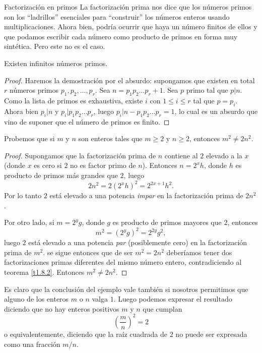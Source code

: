 \begin{section}{Factorización en primos}
La factorización prima nos dice que los números primos son los  ``ladrillos'' esenciales para  ``cons\-truir'' los números enteros usando multiplicaciones. Ahora bien, podría ocurrir que haya un número finitos de ellos y que podamos escribir cada número como producto de primos en forma muy sintética. Pero este no es el caso.

\begin{proposicion} Existen infinitos números primos. 
\end{proposicion} 
\begin{proof} Haremos la demostración por el absurdo: supongamos que existen en total $r$ números primos $p_1,p_2,\ldots, p_r$. Sea $n =  p_1p_2\ldots p_r+1$. Sea $p$ primo tal que $p|n$. Como la lista de primos es exhaustiva, existe $i$ con $1 \le i \le r$ tal que $p=p_i$. Ahora bien $p_i| n$ y $p_i|p_1p_2\ldots p_r$, luego $p_i|n-p_1p_2\ldots p_r =1$, lo cual es un absurdo que vino de suponer que el número de primos es finito.  
\end{proof}



\begin{ejemplo*} Probemos que si $m$ y $n$ son enteros tales que $m\ge 2$ y $n\ge 2$, entonces $m^2  \not=2n^2$.
\end{ejemplo*}
\begin{proof} Supongamos que la factorización prima de $n$ contiene al $2$ elevado a la $x$ (donde $x$ es cero si $2$ no es factor primo de $n$). Entonces $n=2^xh$, donde $h$ es producto de primos más grandes que $2$, luego 
$$
2n^2=2(2^xh)^2= 2^{2x+1}h^2.
$$
Por lo tanto $2$ está elevado a una potencia \textit{impar} en la factorización prima de $2n^2$.

Por otro lado, si $m=2^yg$, donde $g$ es producto de primos mayores que $2$, entonces
$$
m^2= (2^yg)^2 = 2^{2y}g^2,
$$
luego $2$ está elevado a una potencia \textit{par} (posiblemente cero) en la factorización prima de $m^2$. se sigue entonces que de ser $m^2 = 2n^2$ deberíamos tener dos factorizaciones primas diferentes del mismo número entero, contradiciendo al teorema \ref{t1.8.2}. Entonces $m^2 \not= 2n^2$.
\end{proof}

Es claro que la conclusión del ejemplo  vale también si nosotros permitimos que alguno de los enteros $m$ o $n$ valga $1$. Luego podemos expresar el resultado diciendo que no hay enteros positivos $m$ y $n$ que cumplan 
$$
\left(\frac{m}{n}\right)^2 =2
$$
o equivalentemente, diciendo que la raíz cuadrada de $2$ no puede ser expresada como una fracción $m/n$.


\end{section}
